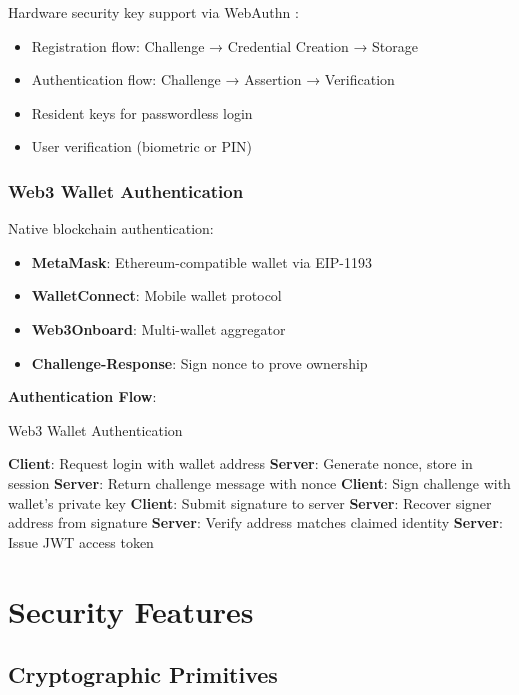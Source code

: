 \documentclass[11pt,a4paper]{article}
\begin{document}
Hardware security key support via WebAuthn \cite{webauthn}:
\begin{itemize}
  \item Registration flow: Challenge → Credential Creation → Storage
  \item Authentication flow: Challenge → Assertion → Verification
  \item Resident keys for passwordless login
  \item User verification (biometric or PIN)
\end{itemize}

\subsubsection{Web3 Wallet Authentication}

Native blockchain authentication:
\begin{itemize}
  \item \textbf{MetaMask}: Ethereum-compatible wallet via EIP-1193
  \item \textbf{WalletConnect}: Mobile wallet protocol
  \item \textbf{Web3Onboard}: Multi-wallet aggregator
  \item \textbf{Challenge-Response}: Sign nonce to prove ownership
\end{itemize}

\textbf{Authentication Flow}:
\begin{algorithm}
\caption{Web3 Wallet Authentication}
\begin{algorithmic}[1]
\State \textbf{Client}: Request login with wallet address
\State \textbf{Server}: Generate nonce, store in session
\State \textbf{Server}: Return challenge message with nonce
\State \textbf{Client}: Sign challenge with wallet's private key
\State \textbf{Client}: Submit signature to server
\State \textbf{Server}: Recover signer address from signature
\State \textbf{Server}: Verify address matches claimed identity
\State \textbf{Server}: Issue JWT access token
\end{algorithmic}
\end{algorithm}

\section{Security Features}

\subsection{Cryptographic Primitives}
\end{document}
